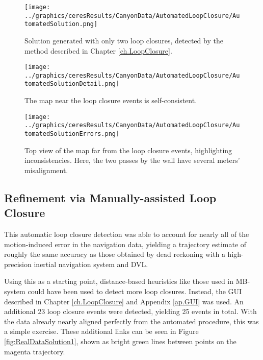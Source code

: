  \begin{figure}[!htb]
   \centering
   \texttt{[image: ../graphics/ceresResults/CanyonData/AutomatedLoopClosure/AutomatedSolution.png]} %
   \caption{Solution generated with only two loop closures, detected by the method described in Chapter \ref{ch.LoopClosure}.}
   \label{fig:AutoSol}
\end{figure}

 \begin{figure}[!htb]
   \centering
   \texttt{[image: ../graphics/ceresResults/CanyonData/AutomatedLoopClosure/AutomatedSolutionDetail.png]} %
   \caption{The map near the loop closure events is self-consistent.}
   \label{fig:AutoSol1}
\end{figure}

 \begin{figure}[!htb]
   \centering
   \texttt{[image: ../graphics/ceresResults/CanyonData/AutomatedLoopClosure/AutomatedSolutionErrors.png]} %
   \caption{Top view of the map far from the loop closure events, highlighting inconsistencies. Here, the two passes by the wall have several meters' misalignment.}
   \label{fig:AutoSol2}
\end{figure}

\subsection{Refinement via Manually-assisted Loop Closure}

This automatic loop closure detection was able to account for nearly all of the motion-induced error in the navigation data, yielding a trajectory estimate of roughly the same accuracy as those obtained by dead reckoning with a high-precision inertial navigation system and DVL. 

Using this as a starting point, distance-based heuristics like those used in MB-system \cite{Caress2006} could have been used to detect more loop closures. Instead, the GUI described in Chapter \ref{ch.LoopClosure} and Appendix \ref{ap.GUI} was used. An additional 23 loop closure events were detected, yielding 25 events in total. With the data already nearly aligned perfectly from the automated procedure, this was a simple exercise. These additional links can be seen in Figure \ref{fig:RealDataSolution1}, shown as bright green lines between points on the magenta trajectory.

